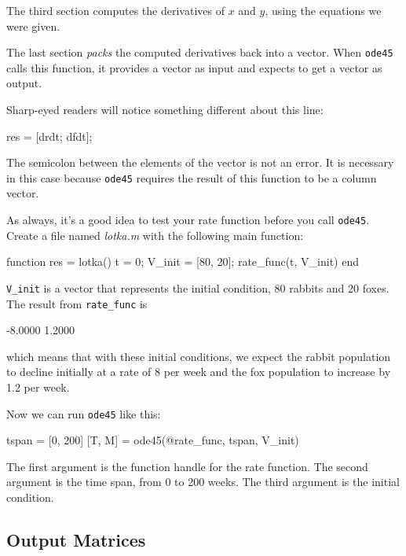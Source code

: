 
The third section computes the derivatives of $x$ and $y$, using the equations
we were given.

The last section \emph{packs} the computed derivatives back into a
vector.  When \lstinline{ode45} calls this function, it provides a vector
as input and expects to get a vector as output.

Sharp-eyed readers will notice something different about this line:

\begin{code}
    res = [drdt; dfdt];
\end{code}

The semicolon between the elements of the vector is not an error.  It
is necessary in this case because \lstinline{ode45} requires the result of
this function to be a column vector.


As always, it's a good idea to test your rate function before you call \lstinline{ode45}.
Create a file named \emph{lotka.m} with the following main function:

\begin{code}
function res = lotka()
    t = 0;
    V_init = [80, 20];
    rate_func(t, V_init)
end
\end{code}


\lstinline{V_init} is a vector that represents the initial condition, 80 rabbits and 20 foxes.
The result from \lstinline{rate_func} is

\begin{code}
-8.0000
 1.2000
 \end{code}
which means that with these initial conditions, we expect the rabbit population to decline initially at a rate of 8 per week and the fox population to increase by 1.2 per week.

Now we can run \lstinline{ode45} like this:

\begin{code}
tspan = [0, 200]
[T, M] = ode45(@rate_func, tspan, V_init)
\end{code}

The first argument is the function handle for the rate function.
The second argument is the time span, from 0 to 200 weeks.
The third argument is the initial condition.



\subsection{Output Matrices}

